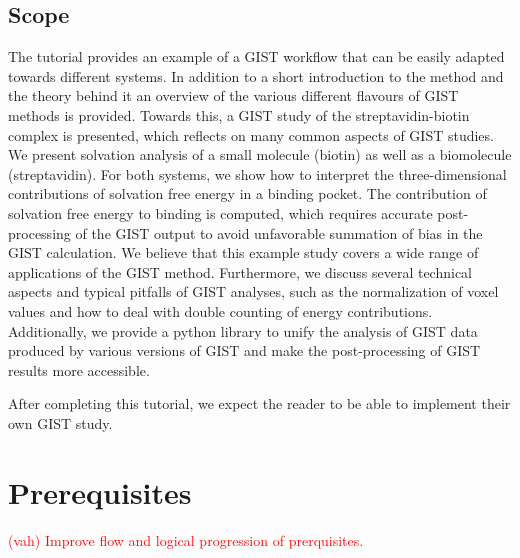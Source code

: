 \documentclass[9pt,tutorial]{livecoms}
\newcommand{\todo}{\textcolor{red}}
\begin{document}
\subsection{Scope}

The tutorial provides an example of a GIST workflow that can be easily adapted towards different systems. 
In addition to a short introduction to the method and the theory behind it an overview of the various different flavours of GIST methods is provided.
Towards this, a GIST study of the streptavidin-biotin complex is presented, which reflects on many common aspects of GIST studies.
We present solvation analysis of a small molecule (biotin) as well as a biomolecule (streptavidin).
For both systems, we show how to interpret the three-dimensional contributions of solvation free energy in a binding pocket.
The contribution of solvation free energy to binding is computed, which requires accurate post-processing of the GIST output to avoid unfavorable summation of bias in the GIST calculation.
We believe that this example study covers a wide range of applications of the GIST method.
Furthermore, we discuss several technical aspects  and typical pitfalls of GIST analyses, such as the normalization of voxel values and how to deal with double counting of energy contributions. 
Additionally, we provide a python library to unify the analysis of GIST data produced by various versions of GIST and make the post-processing of GIST results more accessible.

After completing this tutorial, we expect the reader to be able to implement their own GIST study. 

%

\section{Prerequisites}
\todo{ (vah)  Improve flow and logical progression of prerquisites.}

\end{document}
